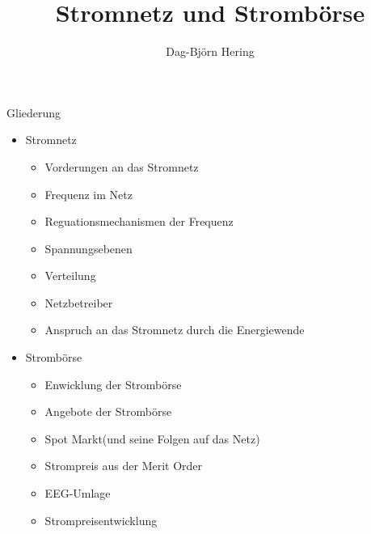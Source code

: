 \documentclass[aspectratio=1610, professionalfonts, 9pt]{beamer}
\title{Stromnetz und Strombörse}
\author[D.~Hering]{Dag-Björn Hering}
\begin{document}
\maketitle
\begin{frame}
\end{frame}

\begin{frame}{Gliederung}
\begin{itemize}
  \item Stromnetz
  \begin{itemize}
  \item Vorderungen an das Stromnetz
  \item Frequenz im Netz
  \item Reguationsmechanismen der Frequenz
  \item Spannungsebenen
  \item Verteilung
  \item Netzbetreiber
  \item Anspruch an das Stromnetz durch die Energiewende
  \end{itemize}
\end{itemize}
\end{frame}
\begin{frame}
\begin{itemize}
 \item Strombörse
\begin{itemize}
  \item Enwicklung der Strombörse
  \item Angebote der Strombörse
  \item Spot Markt(und seine Folgen auf das Netz)
  \item Strompreis aus der Merit Order
  \item EEG-Umlage
  \item Strompreisentwicklung
\end{itemize}
\end{itemize}
\end{frame}
\end{document}
